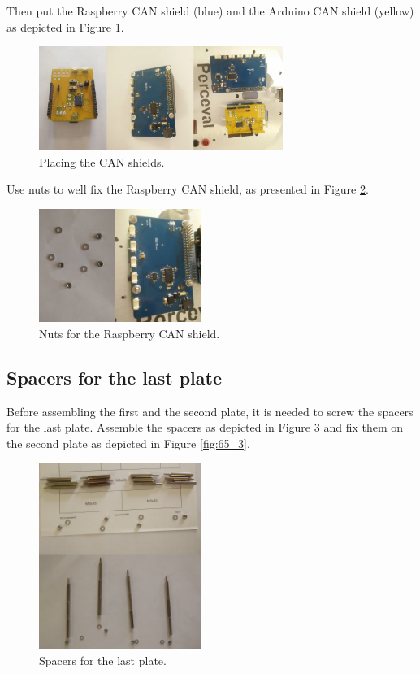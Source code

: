 \documentclass[10pt,a4paper]{report}   %
\begin{document}
Then put the Raspberry CAN shield (blue) and the Arduino CAN shield (yellow) as depicted in Figure \ref{fig:63}.

\begin{figure}[H]
\center
\includegraphics[width=300px]{images/63.jpg}
\caption{Placing the CAN shields.}
\label{fig:63}
\end{figure}

 Use nuts to well fix the Raspberry CAN shield, as presented in Figure \ref{fig:64}.

\begin{figure}[H]
\center
\includegraphics[width=200px]{images/64.jpg}
\caption{Nuts for the Raspberry CAN shield.}
\label{fig:64}
\end{figure}

\subsection{Spacers for the last plate}

Before assembling the first and the second plate, it is needed to screw the spacers for the last plate. Assemble the spacers as depicted in Figure \ref{fig:65_2} and fix them on the second plate as depicted in Figure \ref{fig:65_3}.

\begin{figure}[H]
\center
\includegraphics[width=200px]{images/65_2.jpg}
\caption{Spacers for the last plate.}
\label{fig:65_2}
\end{figure}
\end{document}
